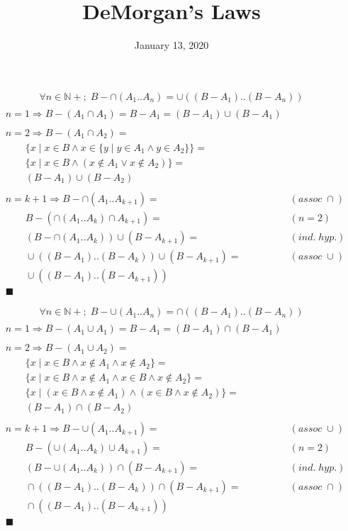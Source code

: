 \documentclass[fleqn, 11pt]{article}
\date{January 13, 2020}
\title{DeMorgan's Laws}
\begin{document}
$$ \forall n \in \mathbb{N+}; \; B - \cap (A_1 .. A_n) = \cup((B - A_1) .. (B - A_n)) $$
\begin{equation*}
\begin{aligned}
& \\
& n = 1 \Rightarrow B - (A_1 \cap A_1) = B - A_1 = (B - A_1) \cup (B - A_1) \\
& \\
& n = 2 \Rightarrow B - (A_1 \cap A_2) =  \\
& \qquad \{x \mid x \in B \land x \in \{y \mid y \in A_1 \land y \in A_2 \}\} = \\
& \qquad \{x \mid x \in B \land (x \notin A_1 \lor x \notin A_2)\} = \\
& \qquad (B - A_1) \cup (B - A_2) \\
& \\
& n = k + 1 \Rightarrow B - \cap(A_1 .. A_{k+1}) = & (assoc \; \cap) \\
& \qquad B - (\cap(A_1 .. A_k) \cap A_{k+1}) = & (n = 2) \\
& \qquad (B - \cap(A_1 ..A_k)) \cup (B - A_{k+1}) = & (ind. \; hyp.) \\
& \qquad \cup((B - A_1) .. (B - A_k)) \cup (B - A_{k+1}) = & (assoc \; \cup) \\
& \qquad \cup((B - A_1) .. (B - A_{k+1})) \\
& \blacksquare
\end{aligned}
\end{equation*}

$$ \forall n \in \mathbb{N+}; \; B - \cup (A_1 .. A_n) = \cap((B - A_1) .. (B - A_n)) $$
\begin{equation*}
\begin{aligned}
& \\
& n = 1 \Rightarrow B - (A_1 \cup A_1) = B - A_1 = (B - A_1) \cap (B - A_1) \\
& \\
& n = 2 \Rightarrow B - (A_1 \cup A_2) =  \\
& \qquad \{x \mid x \in B \land x \notin A_1 \land x \notin A_2 \} = \\
& \qquad \{x \mid x \in B \land x \notin A_1 \land 
           x \in B \land x \notin A_2 \} = \\
& \qquad \{x \mid (x \in B \land x \notin A_1) \land 
           (x \in B \land x \notin A_2) \} = \\
& \qquad (B - A_1) \cap (B - A_2) \\
& \\
& n = k + 1 \Rightarrow B - \cup(A_1 .. A_{k+1}) = & (assoc \; \cup) \\
& \qquad B - (\cup(A_1 .. A_k) \cup A_{k+1}) = & (n = 2) \\
& \qquad (B - \cup(A_1 ..A_k)) \cap (B - A_{k+1}) = & (ind. \; hyp.) \\
& \qquad \cap((B - A_1) .. (B - A_k)) \cap (B - A_{k+1}) = & (assoc \; \cap) \\
& \qquad \cap((B - A_1) .. (B - A_{k+1})) \\
& \blacksquare
\end{aligned}
\end{equation*}
\end{document}
